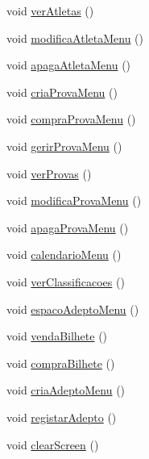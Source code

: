 \begin{DoxyCompactItemize}
void \hyperlink{class_menu_a10eed8f175ddff4a3f6b01010e7b462b}{ver\+Atletas} ()
\item 
void \hyperlink{class_menu_a1803b57b4861a1a9c512a15657eba2f2}{modifica\+Atleta\+Menu} ()
\item 
void \hyperlink{class_menu_a1297455c0dcde9efe57a977620a95091}{apaga\+Atleta\+Menu} ()
\item 
void \hyperlink{class_menu_a22f88ce6c2e5c2e99e3b5bb510f75725}{cria\+Prova\+Menu} ()
\item 
void \hyperlink{class_menu_a7d7e5c60c50f517732594c56c687e007}{compra\+Prova\+Menu} ()
\item 
void \hyperlink{class_menu_ad27d59e38495e239dcad48d5bfba7aa5}{gerir\+Prova\+Menu} ()
\item 
void \hyperlink{class_menu_a8b215f578a6ec8be58b2d8cbe464dfcf}{ver\+Provas} ()
\item 
void \hyperlink{class_menu_a58d5cd0655078b665745f75af8bb43c4}{modifica\+Prova\+Menu} ()
\item 
void \hyperlink{class_menu_a4148128d956d192efbd3eb489ac170bb}{apaga\+Prova\+Menu} ()
\item 
void \hyperlink{class_menu_ad5585aab1106da7c65daa4ef3af4e63a}{calendario\+Menu} ()
\item 
void \hyperlink{class_menu_a6062588d8f20a4ab2304dc9c9fdaaa52}{ver\+Classificacoes} ()
\item 
void \hyperlink{class_menu_a98a46fa2c5c35c6875571bf2864b0e5e}{espaco\+Adepto\+Menu} ()
\item 
void \hyperlink{class_menu_a006d90f89c70667c1b78921d1699df87}{venda\+Bilhete} ()
\item 
void \hyperlink{class_menu_a1267ff1e1b75f1e1003522d1d99a8c7e}{compra\+Bilhete} ()
\item 
void \hyperlink{class_menu_a0bbe99d5051c3e1102d8e2521dacbc02}{cria\+Adepto\+Menu} ()
\item 
void \hyperlink{class_menu_a04fe7a1b1ef14f3629f0d837d1d7b287}{registar\+Adepto} ()
\item 
void \hyperlink{class_menu_ae3a5edcb580112ec449d12d9eb5a3e7c}{clear\+Screen} ()
\end{DoxyCompactItemize}
